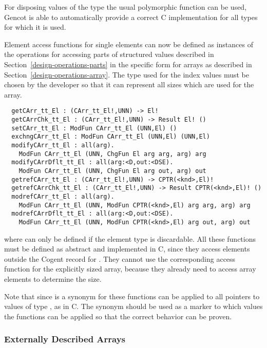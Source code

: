 For disposing values of the type  the usual polymorphic function  can be used, 
Gencot is able to automatically provide a correct C implementation for all types for which it is used.

Element access functions for single elements can now be defined as instances of the operations for accessing parts 
of structured values described in Section~\ref{design-operations-parts} in the specific form for arrays as described
in Section~\ref{design-operations-array}. The type  used for the index
values must be chosen by the developer so that it can represent all sizes which are used for the array.
\begin{verbatim}
  getCArr_tt_El : (CArr_tt_El!,UNN) -> El!
  getCArrChk_tt_El : (CArr_tt_El!,UNN) -> Result El! ()
  setCArr_tt_El : ModFun CArr_tt_El (UNN,El) ()
  exchngCArr_tt_El : ModFun CArr_tt_El (UNN,El) (UNN,El)
  modifyCArr_tt_El : all(arg). 
    ModFun CArr_tt_El (UNN, ChgFun El arg arg, arg) arg
  modifyCArrDflt_tt_El : all(arg:<D,out:<DSE). 
    ModFun CArr_tt_El (UNN, ChgFun El arg out, arg) out
  getrefCArr_tt_El : (CArr_tt_El!,UNN) -> CPTR(<knd>,El)!
  getrefCArrChk_tt_El : (CArr_tt_El!,UNN) -> Result CPTR(<knd>,El)! ()
  modrefCArr_tt_El : all(arg). 
    ModFun CArr_tt_El (UNN, ModFun CPTR(<knd>,El) arg arg, arg) arg
  modrefCArrDflt_tt_El : all(arg:<D,out:<DSE). 
    ModFun CArr_tt_El (UNN, ModFun CPTR(<knd>,El) arg out, arg) out
\end{verbatim}
where  can only be defined if the element type  is discardable. All these functions
must be defined as abstract and implemented in C, since they access elements outside the Cogent record for .
They cannot use the corresponding access function for the explicitly sized array, because they already need to access
array elements to determine the size.

Note that since  is a synonym for  these functions can be applied to 
all pointers to values of type , as in C. The synonym should be used as a marker to which values the functions
can be applied so that the correct behavior can be proven.

\subsubsection{Externally Described Arrays}


